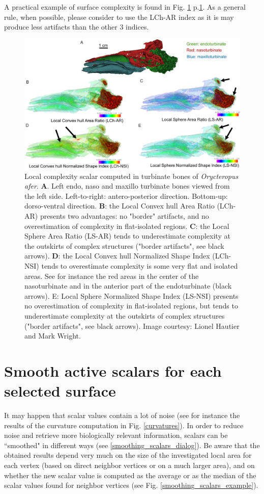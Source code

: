 A practical example of surface complexity is found in Fig. \ref{complexityexample} p.\ref{complexityexample}. As a general rule, when possible, please consider to use the LCh-AR index as it is may produce less artifacts than the other 3 indices.
\begin{figure}
  \centering
  \includegraphics[scale=0.19]{images/11/complexity_example.png} 
	\caption{ 
Local complexity scalar computed in turbinate bones of \textit{Orycteropus afer}. \textbf{A}. Left endo, naso and maxillo turbinate bones viewed from the left side. Left-to-right: antero-posterior direction. Bottom-up: dorso-ventral direction. \textbf{B}: the Local Convex hull Area Ratio (LCh-AR) presents two advantages: no "border" artifacts, and no overestimation of complexity in flat-isolated regions.  \textbf{C}: the Local Sphere Area Ratio (LS-AR) tends to underestimate complexity at the outskirts of complex structures ("border artifacts", see black arrows).  \textbf{D}: the Local Convex hull Normalized Shape Index (LCh-NSI) tends to overestimate complexity is some very flat and isolated areas. See for instance the red areas in the center of the nasoturbinate and in the anterior part of the endoturbinate (black arrows). E: Local Sphere Normalized Shape Index (LS-NSI) presents no overestimation of complexity in flat-isolated regions, but tends to underestimate complexity at the outskirts of complex structures ("border artifacts", see black arrows). Image courtesy: Lionel Hautier and Mark Wright.
	}
\label{complexityexample}
\end{figure}

\section{Smooth active scalars for each selected surface}
It may happen that scalar values contain a lot of noise (see for instance the results of the curvature computation in Fig. \ref{curvatures}). In order to reduce noise and retrieve more biologically relevant information, scalars can be ``smoothed" in different ways (see \ref{smoothing_scalars_dialog}). Be aware that the obtained results depend very much on the size of the investigated local area for each vertex (based on direct neighbor vertices or on a much larger area), and on whether the new scalar value is computed as the average or as the median of the scalar values found for neighbor vertices (see Fig. \ref{smoothing_scalars_example}).

